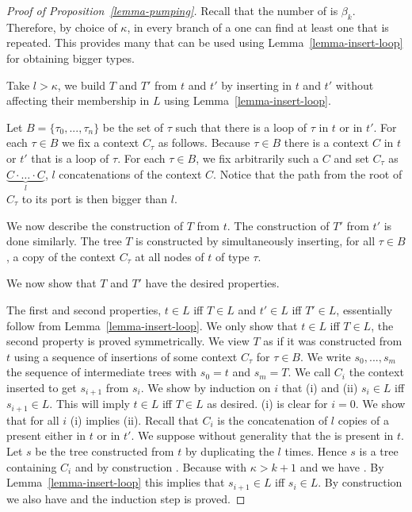 \begin{proof}[Proof of Proposition~\ref{lemma-pumping}]
Recall that the number of \ktypes is $\beta_k$. Therefore, by choice of $\kappa$, in
every branch of a \type{\kappa} one can find at least one \ktype that is repeated.
This provides many \kloops that can be used using Lemma~\ref{lemma-insert-loop}
for obtaining bigger types.

Take $l > \kappa$, we build $T$ and $T'$ from $t$ and $t'$ by inserting \kloops
in $t$ and $t'$ without affecting their membership in $L$ using
Lemma~\ref{lemma-insert-loop}.

  Let $B = \{\tau_{0},...,\tau_{n}\}$ be the set of \ktypes $\tau$ such that
  there is a loop of \ktype $\tau$ in $t$ or in $t'$. For each $\tau \in B$ we
  fix a context $C_\tau$ as follows. Because $\tau \in B$ there is a context
  $C$ in $t$ or $t'$ that is a loop of \ktype $\tau$. For each $\tau \in B$, we
  fix arbitrarily such a $C$ and set $C_\tau$ as $\underbrace{C \cdot \ldots
    \cdot C}_{l}$, $l$ concatenations of the context $C$. Notice that the path
  from the root of $C_\tau$ to its port is then bigger than $l$.

  We now describe the construction of $T$ from $t$. The construction of $T'$
  from $t'$ is done similarly. The tree $T$ is constructed by simultaneously inserting,
  for all $\tau \in B$, a copy of the context $C_\tau$ at all nodes of $t$ of type $\tau$.

  We now show that $T$ and $T'$ have the desired properties. 
  
  The first and second properties, $t \in L$ iff $T \in L$ and $t' \in L$ iff
  $T' \in L$, essentially follow from Lemma~\ref{lemma-insert-loop}. We only
  show that $t \in L$ iff $T \in L$, the second property is proved
  symmetrically. We view $T$ as if it was constructed from $t$ using a sequence
  of insertions of some context $C_\tau$ for $\tau \in B$. We write
  $s_0,...,s_m$ the sequence of intermediate trees with $s_0=t$ and $s_m=T$. We
  call $C_i$ the context inserted to get $s_{i+1}$ from $s_{i}$.  We show by
  induction on $i$ that (i)  and (ii) $s_i \in L$ iff
  $s_{i+1}\in L$. This will imply $t \in L$ iff $T \in L$ as desired.  (i) is
  clear for $i=0$. We show that for all $i$ (i) implies (ii). Recall that $C_i$
  is the concatenation of $l$ copies of a \kloop present either in $t$ or in
  $t'$.  We suppose without generality that the \kloop is present in $t$.  Let
  $s$ be the tree constructed from $t$ by duplicating the \kloop $l$
  times. Hence $s$ is a tree containing $C_i$ and by construction
  . Because  with $\kappa >
  k+1$ and  we have . By
  Lemma~\ref{lemma-insert-loop} this implies that $s_{i+1} \in L$ iff $s_{i}
  \in L$. By construction we also have  and the
  induction step is proved.



\end{proof}
